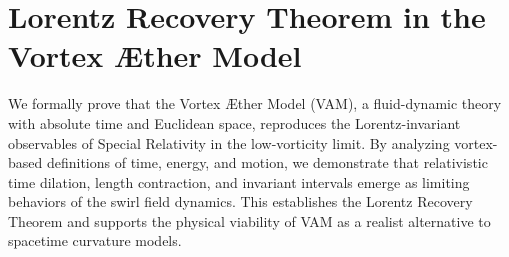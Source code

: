 
%
%
%
%
%
%
%
%
%
%
%
    \section{Lorentz Recovery Theorem in the Vortex Æther Model}
        We formally prove that the Vortex Æther Model (VAM), a fluid-dynamic theory with absolute time and Euclidean space, reproduces the Lorentz-invariant observables of Special Relativity in the low-vorticity limit. By analyzing vortex-based definitions of time, energy, and motion, we demonstrate that relativistic time dilation, length contraction, and invariant intervals emerge as limiting behaviors of the swirl field dynamics. This establishes the Lorentz Recovery Theorem and supports the physical viability of VAM as a realist alternative to spacetime curvature models.
